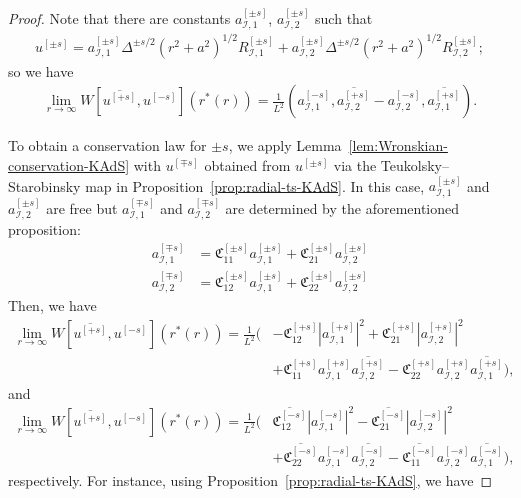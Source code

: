 \documentclass[11pt]{article}
\newcommand{\cI}{\mathcal I}
\numberwithin{equation}{section}
\begin{document}
\begin{proof}
Note that there are constants $a_{\cI,1}^{[\pm s]}$, $a_{\cI,2}^{[\pm s]}$ such that 
\begin{align*}
u^{[\pm s]} = a_{\cI,1}^{[\pm s]}\Delta^{\pm s/2}(r^2+a^2)^{1/2}R_{\cI,1}^{[\pm s]}+ a_{\cI,2}^{[\pm s]}\Delta^{\pm s/2}(r^2+a^2)^{1/2}R_{\cI,2}^{[\pm s]};
\end{align*}
so we have 
\begin{align*}
\lim_{r\to \infty}W[\overline{u^{[+s]}},u^{[-s]}](r^*(r))= \frac{1}{L^2}(a_{\cI,1}^{[-s]},\overline{a_{\cI,2}^{[+s]}}-a_{\cI,2}^{[-s]},\overline{a_{\cI,1}^{[+s]}}).
\end{align*}

To obtain a conservation law for $\pm s$, we apply Lemma~\ref{lem:Wronskian-conservation-KAdS} with $u^{[\mp s]}$ obtained from $u^{[\pm s]}$ via the Teukolsky--Starobinsky map in Proposition~\ref{prop:radial-ts-KAdS}. In this case, $a_{\cI,1}^{[\pm s]}$ and $a_{\cI,2}^{[\pm s]}$ are free but  $a_{\cI,1}^{[\mp s]}$ and $a_{\cI,2}^{[\mp s]}$ are determined by the aforementioned proposition:
\begin{align*}
a_{\cI,1}^{[\mp s]}&=\mathfrak C_{11}^{[\pm s]}a_{\cI,1}^{[\pm s]}+\mathfrak C_{21}^{[\pm s]}a_{\cI,2}^{[\pm s]}\\
a_{\cI,2}^{[\mp s]}&=\mathfrak C_{12}^{[\pm s]}a_{\cI,1}^{[\pm s]}+\mathfrak C_{22}^{[\pm s]}a_{\cI,2}^{[\pm s]}
\end{align*}
Then, we have
\begin{align*}
\lim_{r\to \infty}W[\overline{u^{[+s]}},u^{[-s]}](r^*(r))
=
\frac{1}{L^2}\Big(
&-\mathfrak C_{12}^{[+s]}
\left|a_{\cI,1}^{[+s]}\right|^2
+\mathfrak C_{21}^{[+s]}
\left|a_{\cI,2}^{[+s]}\right|^2 \\
&+\mathfrak C_{11}^{[+s]}
a_{\cI,1}^{[+s]}\overline{a_{\cI,2}^{[+s]}}
-\mathfrak C_{22}^{[+s]}
a_{\cI,2}^{[+s]}\overline{a_{\cI,1}^{[+s]}}
\Big),
\end{align*}
and
\begin{align*}
\lim_{r\to \infty}
W[\overline{u^{[+s]}},u^{[-s]}](r^*(r))
=
\frac{1}{L^2}\Big(
&\overline{\mathfrak C_{12}^{[-s]}}
\left|a_{\cI,1}^{[-s]}\right|^2
-\overline{\mathfrak C_{21}^{[-s]}}
\left|a_{\cI,2}^{[-s]}\right|^2 \\
&+\overline{\mathfrak C_{22}^{[-s]}}
a_{\cI,1}^{[-s]}\overline{a_{\cI,2}^{[-s]}}
-\overline{\mathfrak C_{11}^{[-s]}}
a_{\cI,2}^{[-s]}\overline{a_{\cI,1}^{[-s]}}
\Big),
\end{align*}
respectively. For instance, using Proposition~\ref{prop:radial-ts-KAdS}, we have

\end{proof}
\end{document}
